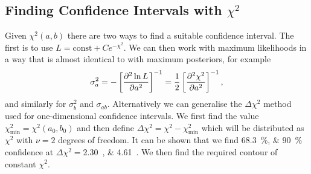 \documentclass[a4paper]{article}
\begin{document}
    \subsection{Finding Confidence Intervals with \texorpdfstring{\(\chi^2\)}{chisquared}}
    Given \(\chi^2(a, b)\) there are two ways to find a suitable confidence interval.
    The first is to use \(L = \text{const} + Ce^{-\chi^2}\).
    We can then work with maximum likelihoods in a way that is almost identical to with maximum posteriors, for example
    \[\sigma_a^2 = -\left[\pdv[2]{\ln L}{a}\right]^{-1} = \frac{1}{2}\left[\pdv[2]{\chi^2}{a}\right]^{-1},\]
    and similarly for \(\sigma_b^2\) and \(\sigma_{ab}\).
    Alternatively we can generalise the \(\Delta\chi^2\) method used for one-dimensional confidence intervals.
    We first find the value \(\chi^2_{\min} = \chi^2(a_0, b_0)\) and then define \(\Delta\chi^2 = \chi^2 - \chi^2_{\min}\) which will be distributed as \(\chi^2\) with \(\nu = 2\) degrees of freedom.
    It can be shown that we find \SIlist{68.3;90}{\percent} confidence at \(\Delta\chi^2 = \)\SIlist{2.30;4.61}{}.
    We then find the required contour of constant \(\chi^2\).
    
\end{document}
